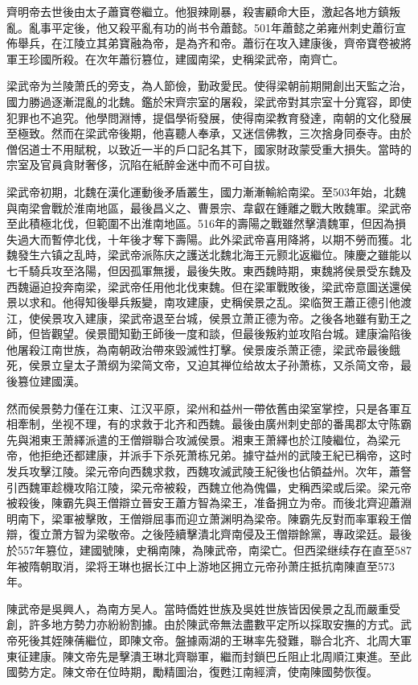 齊明帝去世後由太子蕭寶卷繼立。他狠辣剛暴，殺害顧命大臣，激起各地方鎮叛亂。亂事平定後，他又殺平亂有功的尚书令蕭懿。501年蕭懿之弟雍州刺史蕭衍宣佈舉兵，在江陵立其弟寶融為帝，是為齐和帝。蕭衍在攻入建康後，齊帝寶卷被將軍王珍國所殺。在次年蕭衍篡位，建國南梁，史稱梁武帝，南齊亡。

梁武帝为兰陵萧氏的旁支，為人節儉，勤政愛民。使得梁朝前期開創出天監之治，國力勝過逐漸混亂的北魏。鑑於宋齊宗室的屠殺，梁武帝對其宗室十分寬容，即使犯罪也不追究。他學問淵博，提倡學術發展，使得南梁教育發達，南朝的文化發展至極致。然而在梁武帝後期，他喜聽人奉承，又迷信佛教，三次捨身同泰寺。由於僧侶道士不用賦稅，以致近一半的戶口記名其下，國家財政蒙受重大損失。當時的宗室及官員貪財奢侈，沉陷在紙醉金迷中而不可自拔。

梁武帝初期，北魏在漢化運動後矛盾叢生，國力漸漸輸給南梁。至503年始，北魏與南梁會戰於淮南地區，最後昌义之、曹景宗、韋叡在鍾離之戰大敗魏軍。梁武帝至此積極北伐，但範圍不出淮南地區。516年的壽陽之戰雖然擊潰魏軍，但因為損失過大而暫停北伐，十年後才奪下壽陽。此外梁武帝喜用降將，以期不勞而獲。北魏發生六镇之乱時，梁武帝派陈庆之護送北魏北海王元颢北返繼位。陳慶之雖能以七千騎兵攻至洛陽，但因孤軍無援，最後失敗。東西魏時期，東魏將侯景受东魏及西魏逼迫投奔南梁，梁武帝任用他北伐東魏。但在梁軍戰敗後，梁武帝意圖送還侯景以求和。他得知後舉兵叛變，南攻建康，史稱侯景之乱。梁临贺王蕭正德引他渡江，使侯景攻入建康，梁武帝退至台城，侯景立萧正德为帝。之後各地雖有勤王之師，但皆觀望。侯景聞知勤王師後一度和談，但最後叛約並攻陷台城。建康淪陷後他屠殺江南世族，為南朝政治帶來毀滅性打擊。侯景废杀萧正德，梁武帝最後餓死，侯景立皇太子萧纲为梁简文帝，又迫其禅位给故太子孙萧栋，又杀简文帝，最後篡位建國漢。

然而侯景勢力僅在江東、江汉平原，梁州和益州一帶依舊由梁室掌控，只是各軍互相牽制，坐视不理，有的求救于北齐和西魏。最後由廣州刺史部的番禺郡太守陈霸先與湘東王萧繹派遣的王僧辯聯合攻滅侯景。湘東王萧繹也於江陵繼位，為梁元帝，他拒绝还都建康，并派手下杀死萧栋兄弟。據守益州的武陵王紀已稱帝，这时发兵攻擊江陵。梁元帝向西魏求救，西魏攻滅武陵王紀後也佔領益州。次年，蕭詧引西魏軍趁機攻陷江陵，梁元帝被殺，西魏立他為傀儡，史稱西梁或后梁。梁元帝被殺後，陳霸先與王僧辯立晉安王蕭方智為梁王，准备拥立为帝。而後北齊迎蕭淵明南下，梁軍被擊敗，王僧辯屈事而迎立萧渊明為梁帝。陳霸先反對而率軍殺王僧辯，復立萧方智为梁敬帝。之後陸續擊潰北齊南侵及王僧辯餘黨，專政梁廷。最後於557年篡位，建國號陳，史稱南陳，為陳武帝，南梁亡。但西梁继续存在直至587年被隋朝取消，梁将王琳也据长江中上游地区拥立元帝孙萧庄抵抗南陳直至573年。

陳武帝是吳興人，為南方吴人。當時僑姓世族及吳姓世族皆因侯景之乱而嚴重受創，許多地方勢力亦紛紛割據。由於陳武帝無法盡數平定所以採取安撫的方式。武帝死後其姪陳蒨繼位，即陳文帝。盤據兩湖的王琳率先發難，聯合北齐、北周大軍東征建康。陳文帝先是擊潰王琳北齊聯軍，繼而封鎖巴丘阻止北周順江東進。至此國勢方定。陳文帝在位時期，勵精圖治，復甦江南經濟，使南陳國勢恢復。

